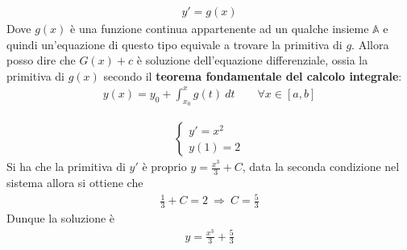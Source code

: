 \documentclass[a4paper, oneside]{book}
\begin{document}
\begin{example}
    \begin{gather*}
        y' = g(x) 
    \end{gather*}
    Dove $g(x) $ è una funzione continua appartenente ad un qualche insieme $\mathbb{A}$ 
    e quindi un'equazione di questo tipo equivale a trovare la primitiva di $g$. 
    Allora posso dire che $G(x) + c$ è soluzione dell'equazione differenziale, ossia la
    primitiva di $g(x)$ secondo il \textbf{teorema fondamentale del calcolo integrale}:
    \begin{gather*}
        y(x) = y_0 + \int_{x_0}^{x} g(t) \ dt \qquad \forall x \in [a, b] 
    \end{gather*}
\end{example}

\clearpage
\begin{example}
    \begin{gather*}
        \left\{\begin{array}{l}
            y' = x^{2} \\
            y(1) = 2 
        \end{array}\right.
    \end{gather*}
    Si ha che la primitiva di $y'$ è proprio $y = \frac{x^{3} }{3} + C$, data la seconda condizione
    nel sistema allora si ottiene che
    \begin{gather*}
        \frac{1}{3}  + C = 2 \ \Longrightarrow \ C = \frac{5}{3}
    \end{gather*}
    Dunque la soluzione è 
    \begin{gather*}
        y = \frac{x^{3}}{3} + \frac{5}{3}
    \end{gather*}
\end{example}
\end{document}
